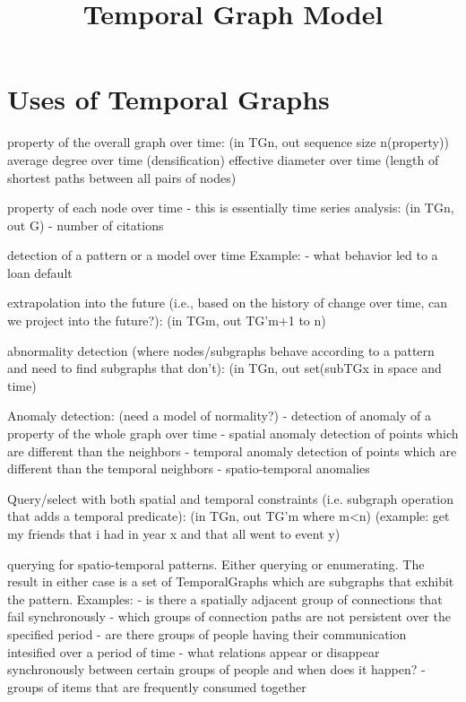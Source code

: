 \newcommand{\julia}[1]{[\textcolor{purple}{{\bf Julia: }#1}]}
\newcommand{\vera}[1]{[\textcolor{orange}{{\bf Vera: }#1}]}



\title{Temporal Graph Model}

\section{Uses of Temporal Graphs}

property of the overall graph over time: (in TGn, out sequence size n(property))
  average degree over time (densification)
  effective diameter over time (length of shortest paths between all pairs of nodes)

property of each node over time - this is essentially time series analysis: (in TGn, out G)
  - number of citations

detection of a pattern or a model over time
Example:
 - what behavior led to a loan default

extrapolation into the future (i.e., based on the history of change over time, can we project into the future?): (in TGm, out TG'm+1 to n)

abnormality detection (where nodes/subgraphs behave according to a pattern and need to find subgraphs that don't): (in TGn, out set(subTGx in space and time)

Anomaly detection: (need a model of normality?)
- detection of anomaly of a property of the whole graph over time
- spatial anomaly detection of points which are different than the neighbors
- temporal anomaly detection of points which are different than the temporal neighbors
- spatio-temporal anomalies

Query/select with both spatial and temporal constraints (i.e. subgraph operation that adds a temporal predicate): (in TGn, out TG'm where m<n)
 (example: get my friends that i had in year x and that all went to event y)


querying for spatio-temporal patterns. Either querying or enumerating. The result in either case is a set of TemporalGraphs which are subgraphs that exhibit the pattern.
Examples:
 - is there a spatially adjacent group of connections that fail synchronously
 - which groups of connection paths are not persistent over the specified period
 - are there groups of people having their communication intesified over a period of time
 - what relations appear or disappear synchronously between certain groups of people and when does it happen?
 - groups of items that are frequently consumed together

